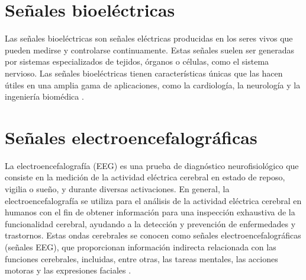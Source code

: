 \section{Señales bioeléctricas}
Las señales bioeléctricas son señales eléctricas producidas en los seres vivos que pueden medirse y controlarse continuamente. Estas señales suelen ser generadas por sistemas especializados de tejidos, órganos o células, como el sistema nervioso. Las señales bioeléctricas tienen características únicas que las hacen útiles en una amplia gama de aplicaciones, como la cardiología, la neurología y la ingeniería biomédica \cite{señales_unam}.

\section{Señales electroencefalográficas}
La electroencefalografía (EEG) es una prueba de diagnóstico neurofisiológico que consiste en la medición de la actividad eléctrica cerebral en estado de reposo, vigilia o sueño, y durante diversas activaciones. En general, la electroencefalografía se utiliza para el análisis de la actividad eléctrica cerebral en humanos con el fin de obtener información para una inspección exhaustiva de la funcionalidad cerebral, ayudando a la detección y prevención de enfermedades y trastornos. Estas ondas cerebrales se conocen como señales electroencefalográficas (señales EEG), que proporcionan información indirecta relacionada con las funciones cerebrales, incluidas, entre otras, las tareas mentales, las acciones motoras y las expresiones faciales \cite{manipula_arm_eeg}.


